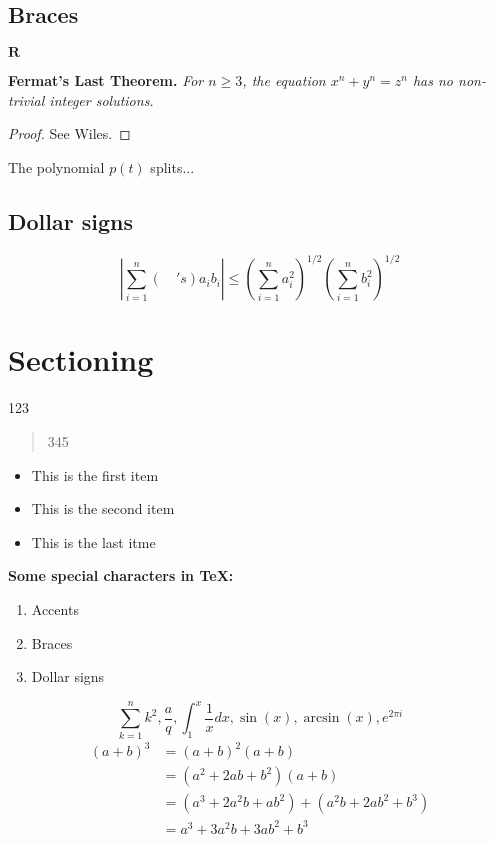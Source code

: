 \documentclass[a4paper,12pt]{article}
\begin{document}
\subsection{Braces}
$\mathbf{R}$

\smallskip
\noindent\textbf{Fermat's Last Theorem.}
\textit{For $n\ge3$, 
the equation $x^n+y^n=z^n$ has no non-trivial integer solutions.}
\smallskip
\begin{proof} See Wiles.
\end{proof}

\begin{itshape}
The polynomial $p(t)$ splits...
\end{itshape}

\subsection{Dollar signs}
\[
\left|\sum_{i=1}^n (\quad's) a_ib_i\right|
\le
\left(\sum_{i=1}^n a_i^2\right)^{1/2}
\left(\sum_{i=1}^n b_i^2\right)^{1/2}
\]

\section{Sectioning}
\begin{center}123 \end{center}
\begin{quote} 345\end{quote}

\begin{itemize}
\item This is the first item
\item This is the second item
\item This is the last itme
\end{itemize}

\smallskip
\textbf{Some special characters in TeX:}\cite{simple,parallel}
\begin{enumerate}
\item Accents  
\item Braces 
\item Dollar signs 
\end{enumerate}

\begin{equation}
\sum_{k=1}^n k^2, \frac{a}{q}, \int_1^x\frac{1}{x}dx, \sin(x), \arcsin(x), e^{2 \pi i}
\end{equation}
\begin{align*} 
(a+b)^3 &= (a+b)^2(a+b)\\
&=(a^2+2ab+b^2)(a+b)\\
&=(a^3+2a^2b+ab^2) + (a^2b+2ab^2+b^3)\\
&=a^3+3a^2b+3ab^2+b^3
\end{align*}
\end{document}
